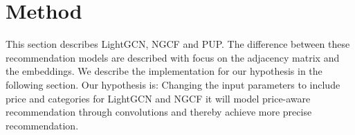 \section{Method}\label{sec:method}
This section describes LightGCN, NGCF and PUP.
The difference between these recommendation models are described with focus on the adjacency matrix and the embeddings.
We describe the implementation for our hypothesis in the following section.
Our hypothesis is: Changing the input parameters to include price and categories for LightGCN and NGCF it will model price-aware recommendation through convolutions and thereby achieve more precise recommendation.





